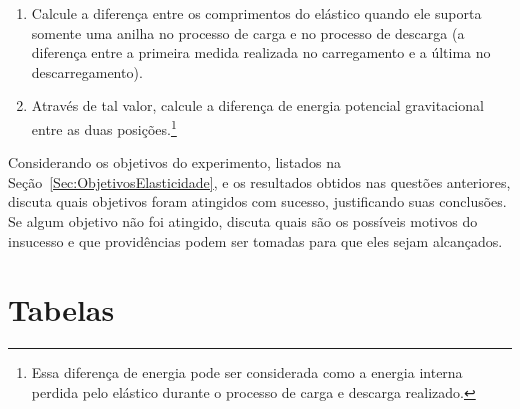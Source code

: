 \begin{question}[type={exam}]{2}
\begin{enumerate}[label=\roman*.]
\item Calcule a diferença entre os comprimentos do elástico quando ele suporta somente uma anilha no processo de carga e no processo de descarga (a diferença entre a primeira medida realizada no carregamento e a última no descarregamento).
\item Através de tal valor, calcule a diferença de energia potencial gravitacional entre as duas posições.\footnote{Essa diferença de energia pode ser considerada como a energia interna perdida pelo elástico durante o processo de carga e descarga realizado.}
\end{enumerate}
\end{question}

\begin{question}[type={exam}]{2}
Considerando os objetivos do experimento, listados na Seção~\ref{Sec:ObjetivosElasticidade}, e os resultados obtidos nas questões anteriores, discuta quais objetivos foram atingidos com sucesso, justificando suas conclusões. Se algum objetivo não foi atingido, discuta quais são os possíveis motivos do insucesso e que providências podem ser tomadas para que eles sejam alcançados.
\end{question}
\vfill

\pagebreak
\section{Tabelas}

